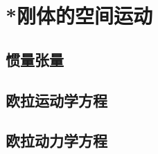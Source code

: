 

\section{*刚体的空间运动}\label{7-3}

\subsection{惯量张量}\label{7-3-1}

\subsection{欧拉运动学方程}\label{7-3-2}

\subsection{欧拉动力学方程}\label{7-3-3}